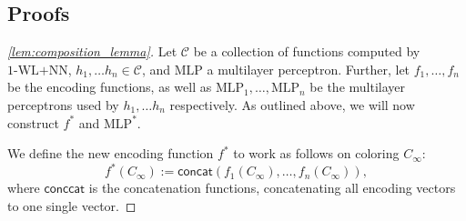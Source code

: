 \documentclass[11pt, dvipsnames, DIV=12]{scrreprt}
\theoremstyle{definition}
\newcommand{\cC}{\mathcal{C}}
\newcommand{\wlnn}{\text{1-WL+NN}}
\newcommand{\mlp}{\text{MLP}}
\begin{document}
\subsection*{Proofs}
\begin{proof}[\cref{lem:composition_lemma}]
    Let $\cC$ be a collection of functions computed by $\wlnn$, $h_1, \dots h_n \in \cC$, and $\text{MLP}$ a multilayer perceptron. Further, let $f_{1}, \ldots, f_{n}$ be the encoding functions, as well as $\text{MLP}_1, \ldots, \text{MLP}_n$ be the multilayer perceptrons used by $h_1, \dots h_n$ respectively. As outlined above, we will now construct $f^*$ and $\mlp^*$.

    We define the new encoding function $f^*$ to work as follows on coloring $C_\infty$:
    \begin{equation*}
        f^*(C_\infty) := \textsf{concat}(f_1(C_\infty), \ldots, f_n(C_\infty)),
    \end{equation*}
    where $\textsf{conccat}$ is the concatenation functions, concatenating all encoding vectors to one single vector.
\end{proof}




\end{document}
